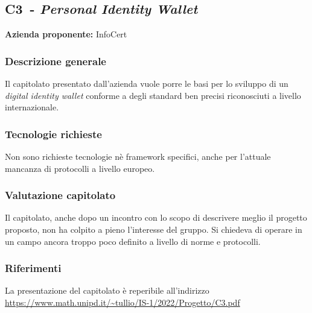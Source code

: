 
\renewcommand{\capName}{\textit{Personal Identity Wallet}} %
\renewcommand{\capCode}{C3} %
\renewcommand{\capLink}{https://www.math.unipd.it/~tullio/IS-1/2022/Progetto/C3.pdf} %
\renewcommand{\capProposer}{InfoCert} %


\subsection{\capCode\ - \capName}
\textbf{Azienda proponente:} InfoCert
\subsubsection{Descrizione generale}
Il capitolato presentato dall'azienda vuole porre le basi per lo sviluppo di un \textit{digital identity wallet} conforme a degli standard ben precisi riconosciuti a livello internazionale.

\subsubsection{Tecnologie richieste}
Non sono richieste tecnologie nè framework specifici, anche per l'attuale mancanza di protocolli a livello europeo.

\subsubsection{Valutazione capitolato}
Il capitolato, anche dopo un incontro con lo scopo di descrivere meglio il progetto proposto, non ha colpito a pieno l'interesse del gruppo. Si chiedeva di operare in un campo ancora troppo poco definito a livello di norme e protocolli.

\subsubsection{Riferimenti}
La presentazione del capitolato è reperibile all'indirizzo \url{\capLink}
